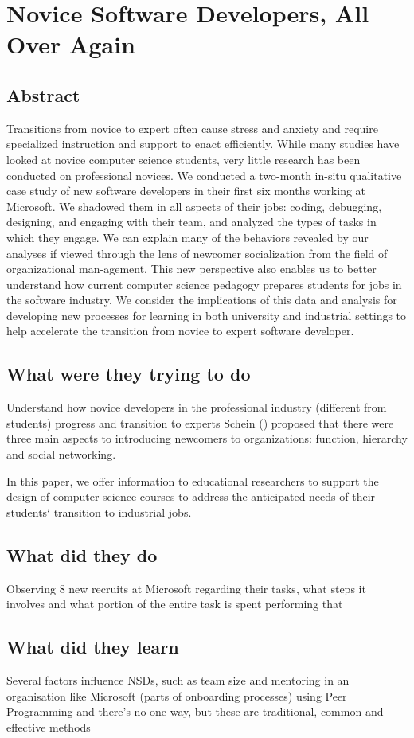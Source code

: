 \section{Novice Software Developers, All Over Again}

\subsection{Abstract}

Transitions from novice to expert often cause stress and anxiety and require specialized instruction and support to enact efficiently. While many studies have looked at novice computer science students, very little research has been conducted on professional novices. We conducted a two-month in-situ qualitative case study of new software developers in their first six months working at Microsoft. We shadowed them in all aspects of their jobs: coding, debugging, designing, and engaging with their team, and analyzed the types of tasks in which they engage. We can explain many of the behaviors revealed by our analyses if viewed through the lens of newcomer socialization from the field of organizational man-agement. This new perspective also enables us to better understand how current computer science pedagogy prepares students for jobs in the software industry. We consider the implications of this data and analysis for developing new processes for learning in both university and industrial settings to help accelerate the transition from novice to expert software developer.

\subsection{What were they trying to do}

Understand how novice developers in the professional industry (different from students) progress and transition to experts
Schein () proposed that there were three main aspects to introducing newcomers to organizations: function, hierarchy and social networking.

In this paper, we offer information to educational researchers to support the design of computer science courses to address the anticipated needs of their students‘ transition to industrial jobs.

\subsection{What did they do}

Observing 8 new recruits at Microsoft regarding their tasks, what steps it involves and what portion of the entire task is spent performing that

\subsection{What did they learn}

Several factors influence NSDs, such as team size and mentoring in an organisation like Microsoft (parts of onboarding processes) using Peer Programming and there's no one-way, but these are traditional, common and effective methods
